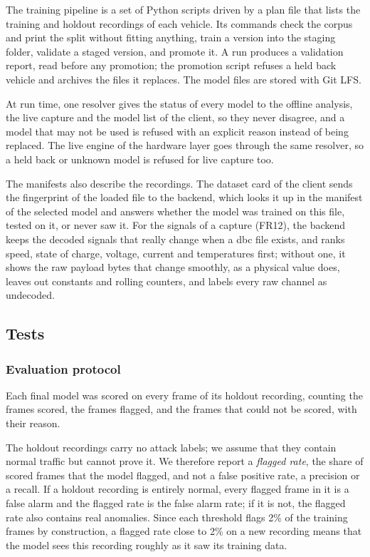The training pipeline is a set of Python scripts driven by a plan file that lists the training and holdout recordings of each vehicle. Its commands check the corpus and print the split without fitting anything, train a version into the staging folder, validate a staged version, and promote it. A run produces a validation report, read before any promotion; the promotion script refuses a held back vehicle and archives the files it replaces. The model files are stored with Git LFS.

At run time, one resolver gives the status of every model to the offline analysis, the live capture and the model list of the client, so they never disagree, and a model that may not be used is refused with an explicit reason instead of being replaced. The live engine of the hardware layer goes through the same resolver, so a held back or unknown model is refused for live capture too.

\label{sec:impl-capture}
The manifests also describe the recordings. The dataset card of the client sends the fingerprint of the loaded file to the backend, which looks it up in the manifest of the selected model and answers whether the model was trained on this file, tested on it, or never saw it. For the signals of a capture (FR12), the backend keeps the decoded signals that really change when a \gls{dbc} file exists, and ranks speed, state of charge, voltage, current and temperatures first; without one, it shows the raw payload bytes that change smoothly, as a physical value does, leaves out constants and rolling counters, and labels every raw channel as undecoded.

\subsection{Tests}

\subsubsection{Evaluation protocol}
\label{sec:validation-protocol}

Each final model was scored on every frame of its holdout recording, counting the frames scored, the frames flagged, and the frames that could not be scored, with their reason.

The holdout recordings carry no attack labels; we assume that they contain normal traffic but cannot prove it. We therefore report a \emph{flagged rate}, the share of scored frames that the model flagged, and not a false positive rate, a precision or a recall. If a holdout recording is entirely normal, every flagged frame in it is a false alarm and the flagged rate is the false alarm rate; if it is not, the flagged rate also contains real anomalies. Since each threshold flags 2\% of the training frames by construction, a flagged rate close to 2\% on a new recording means that the model sees this recording roughly as it saw its training data.

